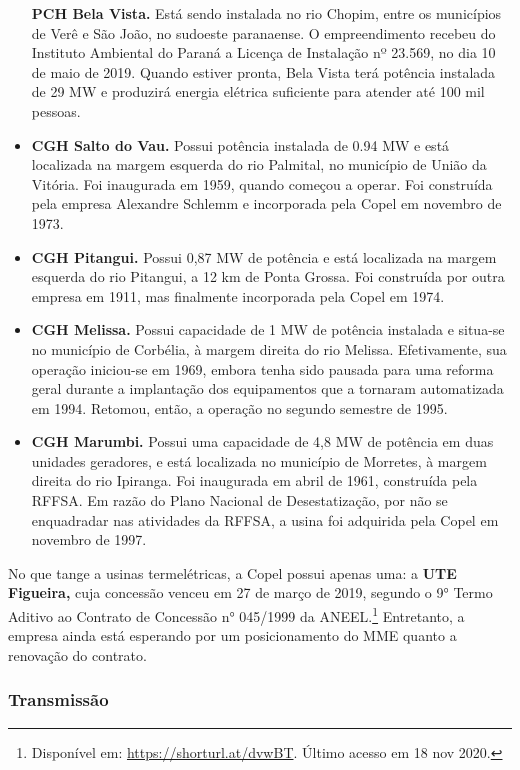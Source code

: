 \documentclass[grad,numbers]{coppe}
\begin{document}
\begin{itemize}
    \textbf{PCH Bela Vista.} Está sendo instalada no rio Chopim, entre os municípios de Verê e São João, no sudoeste paranaense. O empreendimento recebeu do Instituto Ambiental do Paraná a Licença de Instalação nº 23.569, no dia 10 de maio de 2019. Quando estiver pronta, Bela Vista terá potência instalada de 29 MW e produzirá energia elétrica suficiente para atender até 100 mil pessoas.
  \item
    \textbf{CGH Salto do Vau.} Possui potência instalada de 0.94 MW e está localizada na margem esquerda do rio Palmital, no município de União da Vitória. Foi inaugurada em 1959, quando começou a operar. Foi construída pela empresa Alexandre Schlemm e incorporada pela Copel em novembro de 1973.
  \item
    \textbf{CGH Pitangui.} Possui 0,87 MW de potência e está localizada na margem esquerda do rio Pitangui, a 12 km de Ponta Grossa. Foi construída por outra empresa em 1911, mas finalmente incorporada pela Copel em 1974.
  \item
    \textbf{CGH Melissa.} Possui capacidade de 1 MW de potência instalada e situa-se no município de Corbélia, à margem direita do rio Melissa. Efetivamente, sua operação iniciou-se em 1969, embora tenha sido pausada para uma reforma geral durante a implantação dos equipamentos que a tornaram automatizada em 1994. Retomou, então, a operação no segundo semestre de 1995.
  \item
    \textbf{CGH Marumbi.} Possui uma capacidade de 4,8 MW de potência em duas unidades geradores, e está localizada no município de Morretes, à margem direita do rio Ipiranga. Foi inaugurada em abril de 1961, construída pela RFFSA. Em razão do Plano Nacional de Desestatização, por não se enquadradar nas atividades da RFFSA, a usina foi adquirida pela Copel em novembro de 1997.
  \end{itemize}
  No que tange a usinas termelétricas, a Copel possui apenas uma: a \textbf{UTE Figueira,} cuja concessão venceu em 27 de março de 2019, segundo o 9° Termo Aditivo ao Contrato de Concessão n° 045/1999 da ANEEL.\footnote{Disponível em: \url{https://shorturl.at/dvwBT}. Último acesso em 18 nov 2020.} Entretanto, a empresa ainda está esperando por um posicionamento do MME quanto a renovação do contrato.

  \hypertarget{transmissuxe3o}{%
  \subsubsection{Transmissão}\label{transmissuxe3o}}
\end{document}
